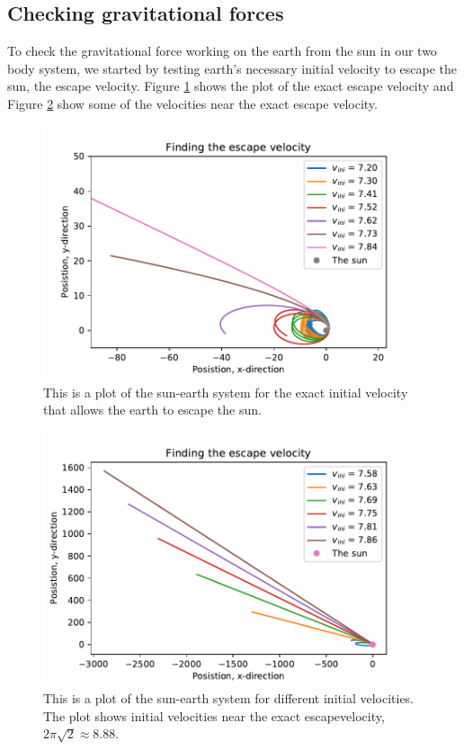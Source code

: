 \subsection{Checking gravitational forces}

To check the gravitational force working on the earth from the sun in our two body system, we started by testing earth's necessary initial velocity to escape the sun, the escape velocity. Figure \ref{fig:escape_velocity_exact} shows the plot of the exact escape velocity and Figure \ref{fig:escape_velocity_near_exact} show some of the velocities near the exact escape velocity.

\begin{figure}[H]
\includegraphics[width=0.9\linewidth]{../results/plots/escape_velocity.pdf}\caption{This is a plot of the sun-earth system for the exact initial velocity that allows the earth to escape the sun.}\label{fig:escape_velocity_exact}
\end{figure}

\begin{figure}[H]
\includegraphics[width=0.9\linewidth]{../results/plots/escape_velocity_closeto_exact.pdf}\caption{This is a plot of the sun-earth system for different initial velocities. The plot shows initial velocities near the exact escapevelocity, $2\pi\sqrt{2} \approx 8.88 $. }\label{fig:escape_velocity_near_exact}
\end{figure}

